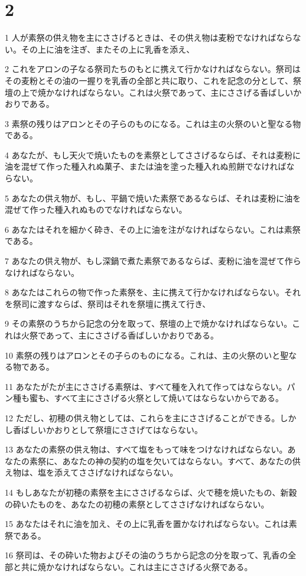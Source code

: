 \chapter{2}

\par 1 人が素祭の供え物を主にささげるときは、その供え物は麦粉でなければならない。その上に油を注ぎ、またその上に乳香を添え、
\par 2 これをアロンの子なる祭司たちのもとに携えて行かなければならない。祭司はその麦粉とその油の一握りを乳香の全部と共に取り、これを記念の分として、祭壇の上で焼かなければならない。これは火祭であって、主にささげる香ばしいかおりである。
\par 3 素祭の残りはアロンとその子らのものになる。これは主の火祭のいと聖なる物である。
\par 4 あなたが、もし天火で焼いたものを素祭としてささげるならば、それは麦粉に油を混ぜて作った種入れぬ菓子、または油を塗った種入れぬ煎餅でなければならない。
\par 5 あなたの供え物が、もし、平鍋で焼いた素祭であるならば、それは麦粉に油を混ぜて作った種入れぬものでなければならない。
\par 6 あなたはそれを細かく砕き、その上に油を注がなければならない。これは素祭である。
\par 7 あなたの供え物が、もし深鍋で煮た素祭であるならば、麦粉に油を混ぜて作らなければならない。
\par 8 あなたはこれらの物で作った素祭を、主に携えて行かなければならない。それを祭司に渡すならば、祭司はそれを祭壇に携えて行き、
\par 9 その素祭のうちから記念の分を取って、祭壇の上で焼かなければならない。これは火祭であって、主にささげる香ばしいかおりである。
\par 10 素祭の残りはアロンとその子らのものになる。これは、主の火祭のいと聖なる物である。
\par 11 あなたがたが主にささげる素祭は、すべて種を入れて作ってはならない。パン種も蜜も、すべて主にささげる火祭として焼いてはならないからである。
\par 12 ただし、初穂の供え物としては、これらを主にささげることができる。しかし香ばしいかおりとして祭壇にささげてはならない。
\par 13 あなたの素祭の供え物は、すべて塩をもって味をつけなければならない。あなたの素祭に、あなたの神の契約の塩を欠いてはならない。すべて、あなたの供え物は、塩を添えてささげなければならない。
\par 14 もしあなたが初穂の素祭を主にささげるならば、火で穂を焼いたもの、新穀の砕いたものを、あなたの初穂の素祭としてささげなければならない。
\par 15 あなたはそれに油を加え、その上に乳香を置かなければならない。これは素祭である。
\par 16 祭司は、その砕いた物およびその油のうちから記念の分を取って、乳香の全部と共に焼かなければならない。これは主にささげる火祭である。

